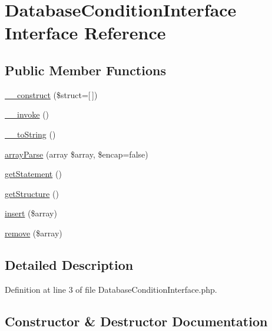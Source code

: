 \hypertarget{interface_database_condition_interface}{}\section{Database\+Condition\+Interface Interface Reference}
\label{interface_database_condition_interface}
\subsection*{Public Member Functions}
\begin{DoxyCompactItemize}
\item 
\hyperlink{interface_database_condition_interface_aeb576c3b33394f5ab4f37c7e64d44502}{\+\_\+\+\_\+construct} (\$struct=\mbox{[}$\,$\mbox{]})
\item 
\hyperlink{interface_database_condition_interface_a9aac7e1475efe923de4e19cc2511f092}{\+\_\+\+\_\+invoke} ()
\item 
\hyperlink{interface_database_condition_interface_a7516ca30af0db3cdbf9a7739b48ce91d}{\+\_\+\+\_\+to\+String} ()
\item 
\hyperlink{interface_database_condition_interface_a8fe63e52baa6d003a96482ee5068abe5}{array\+Parse} (array \$array, \$encap=false)
\item 
\hyperlink{interface_database_condition_interface_a71922b66dbbd931e3bd73bd0b8c6bc0f}{get\+Statement} ()
\item 
\hyperlink{interface_database_condition_interface_ac039a7d66b72b41cbc80f4507d254f68}{get\+Structure} ()
\item 
\hyperlink{interface_database_condition_interface_a0746ee466ee9178068496aa443ed9189}{insert} (\$array)
\item 
\hyperlink{interface_database_condition_interface_a170962f6550bf5cefcf4a871dcebc25e}{remove} (\$array)
\end{DoxyCompactItemize}


\subsection{Detailed Description}


Definition at line 3 of file Database\+Condition\+Interface.\+php.



\subsection{Constructor \& Destructor Documentation}
\hypertarget{interface_database_condition_interface_aeb576c3b33394f5ab4f37c7e64d44502}{}
